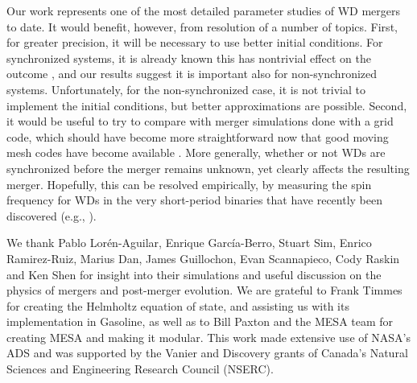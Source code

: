 Our work represents one of the most detailed parameter studies of WD mergers to date.  It would benefit, however, from resolution of a number of topics.  First, for greater precision, it will be necessary to use better initial conditions.  For synchronized systems, it is already known this has nontrivial effect on the outcome \citep{dan+11,dan+12}, and our results suggest it is important also for non-synchronized systems.  Unfortunately, for the non-synchronized case, it is not trivial to implement the initial conditions, but better approximations are possible.  Second, it would be useful to try to compare with merger simulations done with a grid code, which should have become more straightforward now that good moving mesh codes have become available \citep{spri10,duffm11}.  More generally, whether or not WDs are synchronized before the merger remains unknown, yet clearly affects the resulting merger.  Hopefully, this can be resolved empirically, by measuring the spin frequency for WDs in the very short-period binaries that have recently been discovered (e.g., \citealt{brow+11}).

\vspace{5mm}

We thank Pablo Lor\'{e}n-Aguilar, Enrique Garc\'{i}a-Berro, Stuart Sim, Enrico Ramirez-Ruiz, Marius Dan, James Guillochon, Evan Scannapieco, Cody Raskin and Ken Shen for insight into their simulations and useful discussion on the physics of mergers and post-merger evolution.  We are grateful to Frank Timmes for creating the Helmholtz equation of state, and assisting us with its implementation in Gasoline, as well as to Bill Paxton and the MESA team for creating MESA and making it modular.  This work made extensive use of NASA's ADS and was supported by the Vanier and Discovery grants of Canada's Natural Sciences and Engineering Research Council (NSERC).
